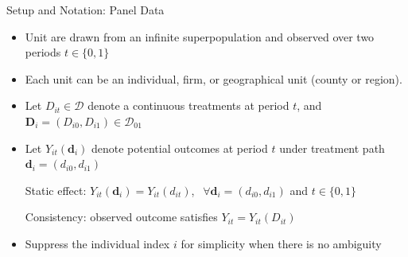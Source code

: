 \documentclass[aspectratio=1610, 9pt]{beamer}
\begin{document}
\begin{frame}{Setup and Notation: Panel Data}

\begin{itemize}
     \item Unit are drawn from an infinite superpopulation and observed over two periods $t\in \{0,1\}$
     \vspace{0.1cm}
     \item Each unit can be an individual, firm, or geographical unit (county or region).   
          \vspace{0.1cm}

     \item Let $D_{it}\in\mathcal{D}$ denote a continuous treatments at period $t$, and $\mathbf{D}_i=(D_{i0},D_{i1})\in \mathcal{D}_{01}$
    \\ 
    \vspace{0.1cm}
    \item Let $Y_{it}(\mathbf{d}_i)$ denote potential outcomes at period $t$ under treatment path $\mathbf{d}_i=(d_{i0},d_{i1})$ 
    
    Static effect: $Y_{it}(\mathbf{d}_i)=Y_{it}(d_{it})$, $\ \ \forall \mathbf{d}_i=(d_{i0},d_{i1})$ and $t\in \{0,1\}$
    
    Consistency: observed outcome satisfies $Y_{it}=Y_{it}(D_{it})$
    \vspace{0.1cm}

    \item Suppress the individual index $i$ for simplicity when there is no ambiguity

\end{itemize}



\end{frame}
\end{document}
